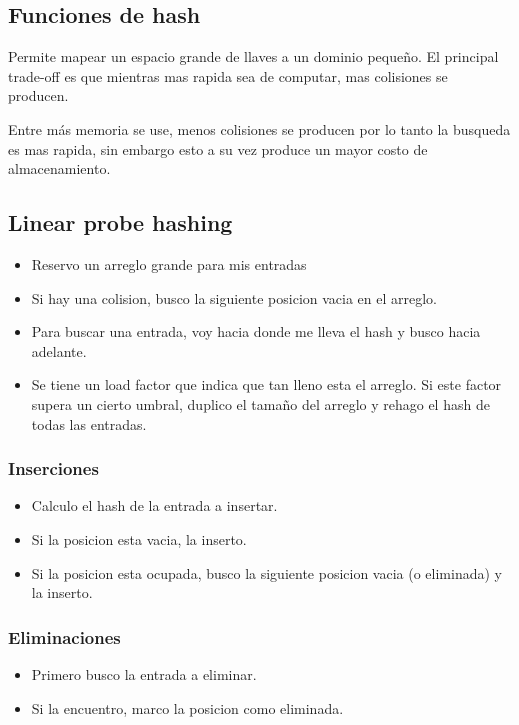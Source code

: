 \subsection{Funciones de hash}
Permite mapear un espacio grande de llaves a un dominio pequeño. El principal trade-off es que mientras mas rapida sea de computar, mas colisiones se producen.

Entre más memoria se use, menos colisiones se producen por lo tanto la busqueda es mas rapida, sin embargo esto a su vez produce un mayor costo de almacenamiento.

\subsection{Linear probe hashing}

\begin{itemize}
  \item Reservo un arreglo grande para mis entradas
  \item Si hay una colision, busco la siguiente posicion vacia en el arreglo.
  \item Para buscar una entrada, voy hacia donde me lleva el hash y busco hacia adelante.
  \item Se tiene un load factor que indica que tan lleno esta el arreglo. Si este factor supera un cierto umbral, duplico el tamaño del arreglo y rehago el hash de todas las entradas.
\end{itemize}

\subsubsection{Inserciones}
\begin{itemize}
  \item Calculo el hash de la entrada a insertar.
  \item Si la posicion esta vacia, la inserto.
  \item Si la posicion esta ocupada, busco la siguiente posicion vacia (o eliminada) y la inserto.
\end{itemize}

\subsubsection{Eliminaciones}
\begin{itemize}
  \item Primero busco la entrada a eliminar.
  \item Si la encuentro, marco la posicion como eliminada.
\end{itemize}

